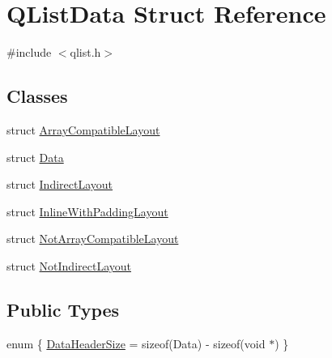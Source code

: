 \hypertarget{struct_q_list_data}{}\section{Q\+List\+Data Struct Reference}
\label{struct_q_list_data}


{\ttfamily \#include $<$qlist.\+h$>$}

\subsection*{Classes}
\begin{DoxyCompactItemize}
\item 
struct \hyperlink{struct_q_list_data_1_1_array_compatible_layout}{Array\+Compatible\+Layout}
\item 
struct \hyperlink{struct_q_list_data_1_1_data}{Data}
\item 
struct \hyperlink{struct_q_list_data_1_1_indirect_layout}{Indirect\+Layout}
\item 
struct \hyperlink{struct_q_list_data_1_1_inline_with_padding_layout}{Inline\+With\+Padding\+Layout}
\item 
struct \hyperlink{struct_q_list_data_1_1_not_array_compatible_layout}{Not\+Array\+Compatible\+Layout}
\item 
struct \hyperlink{struct_q_list_data_1_1_not_indirect_layout}{Not\+Indirect\+Layout}
\end{DoxyCompactItemize}
\subsection*{Public Types}
\begin{DoxyCompactItemize}
\item 
enum \{ \hyperlink{struct_q_list_data_a88af8e9d6ad89d620342699337adecd9ab7e25b7cb0b58eba7ee40732ecf04f87}{Data\+Header\+Size} = sizeof(Data) -\/ sizeof(void $\ast$)
 \}
\end{DoxyCompactItemize}
